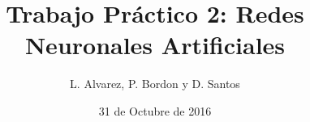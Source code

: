 \documentclass[onecolumn,10pt]{article}
\begin{document}
 

\title{Trabajo Práctico 2: Redes Neuronales Artificiales}

\author{L. Alvarez, P. Bordon y D. Santos}

\date{31 de Octubre de 2016}


\maketitle


\newpage

\tableofcontents

\newpage






\end{document}
